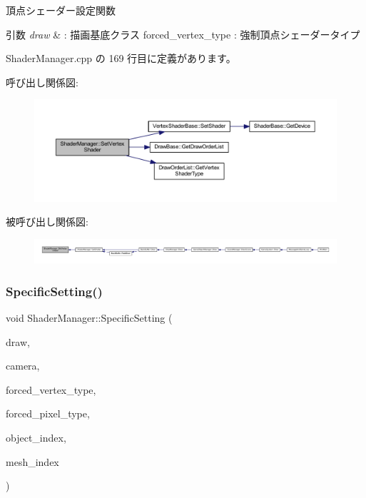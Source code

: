 頂点シェーダー設定関数 


\begin{DoxyParams}{引数}
{\em draw} & \+: 描画基底クラス forced\+\_\+vertex\+\_\+type \+: 強制頂点シェーダータイプ \\
\hline
\end{DoxyParams}


 Shader\+Manager.\+cpp の 169 行目に定義があります。

呼び出し関係図\+:
\nopagebreak
\begin{figure}[H]
\begin{center}
\leavevmode
\includegraphics[width=350pt]{class_shader_manager_a3661a079ae4e9e7e4d5da35f2171b41e_cgraph}
\end{center}
\end{figure}
被呼び出し関係図\+:
\nopagebreak
\begin{figure}[H]
\begin{center}
\leavevmode
\includegraphics[width=350pt]{class_shader_manager_a3661a079ae4e9e7e4d5da35f2171b41e_icgraph}
\end{center}
\end{figure}
\mbox{\label{class_shader_manager_af016392b9b0477d49165d753e9404ff4}} 
\subsubsection{\texorpdfstring{Specific\+Setting()}{SpecificSetting()}}
{\footnotesize\ttfamily void Shader\+Manager\+::\+Specific\+Setting (\begin{DoxyParamCaption}\item[{\mbox{\hyperlink{class_draw_base}{Draw\+Base}} $\ast$}]{draw,  }\item[{\mbox{\hyperlink{class_camera}{Camera}} $\ast$}]{camera,  }\item[{\mbox{\hyperlink{class_shader_manager_a9b51e49d70eb3cc58f6d1f3994e8cfbd}{Vertex\+Shader\+Type}}}]{forced\+\_\+vertex\+\_\+type,  }\item[{\mbox{\hyperlink{class_shader_manager_a7d15d773b3c6a99dd7086c45c8b0be5f}{Pixel\+Shader\+Type}}}]{forced\+\_\+pixel\+\_\+type,  }\item[{unsigned}]{object\+\_\+index,  }\item[{unsigned}]{mesh\+\_\+index }\end{DoxyParamCaption})}



